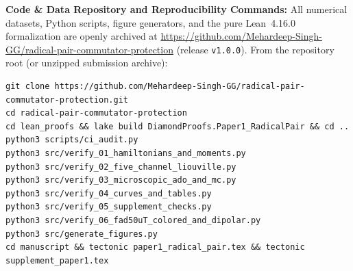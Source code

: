 \documentclass[onecolumn,10pt,notitlepage,amsmath,amssymb,floatfix]{revtex4-2}
\theoremstyle{plain}
\theoremstyle{definition}
\begin{document}
{\def\UrlBreaks{\do\/\do-}\textbf{Code \& Data Repository and Reproducibility Commands:} All numerical datasets, Python scripts, figure generators, and the pure Lean~4.16.0 formalization are openly archived at \url{https://github.com/Mehardeep-Singh-GG/radical-pair-commutator-protection} (release \texttt{v1.0.0}). From the repository root (or unzipped submission archive):}
{\small
\begin{verbatim}
git clone https://github.com/Mehardeep-Singh-GG/radical-pair-commutator-protection.git
cd radical-pair-commutator-protection
cd lean_proofs && lake build DiamondProofs.Paper1_RadicalPair && cd ..
python3 scripts/ci_audit.py
python3 src/verify_01_hamiltonians_and_moments.py
python3 src/verify_02_five_channel_liouville.py
python3 src/verify_03_microscopic_ado_and_mc.py
python3 src/verify_04_curves_and_tables.py
python3 src/verify_05_supplement_checks.py
python3 src/verify_06_fad50uT_colored_and_dipolar.py
python3 src/generate_figures.py
cd manuscript && tectonic paper1_radical_pair.tex && tectonic supplement_paper1.tex
\end{verbatim}
}
\end{document}
